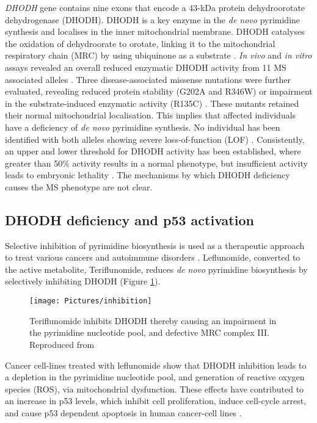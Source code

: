 \documentclass[12pt]{article}
\begin{document}
	\textit{DHODH} gene contains nine exons that encode a 43-kDa protein dehydroorotate dehydrogenase (DHODH). DHODH is a key enzyme in the \textit{de novo} pyrimidine synthesis and localises in the inner mitochondrial membrane. DHODH catalyses the oxidation of dehydroorate to orotate, linking it to the  mitochondrial respiratory chain (MRC) by using ubiquinone as a substrate \citep{fang2013dihydro}. \textit{In vivo } and \textit{in vitro} assays revealed an overall reduced enzymatic DHODH activity from 11 MS associated alleles \citep{doi:10.1093/hmg/dds218}. Three disease-associated missense mutations were further evaluated, revealing reduced protein stability (G202A and R346W) or impairment in the substrate-induced enzymatic activity (R135C) \citep{fang2012protein}. These mutants retained their normal mitochondrial localisation. This implies that affected individuals have a deficiency of \textit{de novo} pyrimidine synthesis. No individual has been identified with both alleles showing severe loss-of-function (LOF) \citep{doi:10.1093/hmg/dds218}. Consistently, an upper and lower threshold for DHODH activity has been established, where greater than 50\% activity results in a normal phenotype, but insufficient activity leads to embryonic lethality \citep{doi:10.1093/hmg/dds218}. The mechanisms by which DHODH deficiency causes the MS phenotype are not clear. 


\subsection{DHODH deficiency and  p53 activation }
	Selective inhibition of pyrimidine biosynthesis is used as a therapeutic approach to treat various cancers and autoimmune disorders \citep{ren2017leflunomide, liu2017inactivation, leban2011human}. Leflunomide, converted to the active metabolite, Teriflunomide, reduces \textit{de novo} pyrimidine biosynthesis by selectively inhibiting DHODH (Figure \ref{fig:inhibition}). 
	 
	 \begin{figure}[!htp]
	 	\centering
	 	\texttt{[image: Pictures/inhibition]}
	 	\caption{Teriflunomide inhibits DHODH thereby causing an impairment in the pyrimidine nucleotide pool, and defective MRC complex III. Reproduced from \cite{velez2013mitochondrial}}
	 	\label{fig:inhibition}
	 \end{figure}
	 
	Cancer cell-lines treated with leflunomide show that DHODH inhibition leads to a depletion in the pyrimidine nucleotide pool, and generation of reactive oxygen species (ROS), via mitochondrial dysfunction. These effects have contributed to an increase in p53 levels, which inhibit cell proliferation, induce cell-cycle arrest, and cause p53 dependent apoptosis in human cancer-cell lines  \citep{linke1996reversible, khutornenko2010pyrimidine, hail2012evidence, fairus2017dihydroorotate}. 
	
\end{document}
